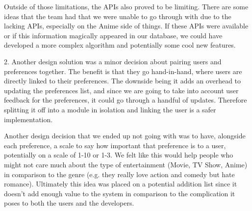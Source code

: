 \documentclass[12pt, titlepage]{article}
\begin{document}
Outside of those limitations, the APIs also proved to be limiting. There are some ideas that the team had that we were unable to go through with due to the lacking APIs, especially on the Anime side of things. If these APIs were available or if this information magically appeared in our database, we could have developed a more complex algorithm and potentially some cool new features. 
	
2. Another design solution was a minor decision about pairing users and preferences together. The benefit is that they go hand-in-hand, where users are directly linked to their preferences. The downside being it adds an overhead to updating the preferences list, and since we are going to take into account user feedback for the preferences, it could go through a handful of updates. Therefore splitting it off into a module in isolation and linking the user is a safer implementation.

Another design decision that we ended up not going with was to have, alongside each preference, a scale to say how important that preference is to a user, potentially on a scale of 1-10 or 1-3. We felt like this would help people who might not care much about the type of entertainment (Movie, TV Show, Anime) in comparison to the genre (e.g. they really love action and comedy but hate romance). Ultimately this idea was placed on a potential addition list since it doesn't add enough value to the system in comparison to the complication it poses to both the users and the developers. 
\end{document}
